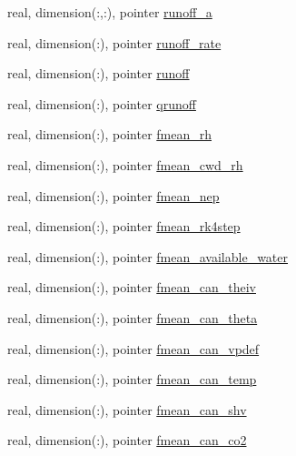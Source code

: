 \begin{DoxyCompactItemize}
\item 
real, dimension(\+:,\+:), pointer \hyperlink{structed__state__vars_1_1sitetype_a2b8d17aeef517cb4e97ad81d3e709b47}{runoff\+\_\+a}
\item 
real, dimension(\+:), pointer \hyperlink{structed__state__vars_1_1sitetype_a608500a8f7ada46291e883d8fec60003}{runoff\+\_\+rate}
\item 
real, dimension(\+:), pointer \hyperlink{structed__state__vars_1_1sitetype_a505920799c9fbba2c8da78e190fd85e9}{runoff}
\item 
real, dimension(\+:), pointer \hyperlink{structed__state__vars_1_1sitetype_a60b4460a57db2b2889aad624dee4ed82}{qrunoff}
\item 
real, dimension(\+:), pointer \hyperlink{structed__state__vars_1_1sitetype_a75cb5c6224b027d13217fab3a59af040}{fmean\+\_\+rh}
\item 
real, dimension(\+:), pointer \hyperlink{structed__state__vars_1_1sitetype_a8040b50d206d96420b709be00647d53a}{fmean\+\_\+cwd\+\_\+rh}
\item 
real, dimension(\+:), pointer \hyperlink{structed__state__vars_1_1sitetype_a36e30c5b27a4f20c7f680d07ae29bd3b}{fmean\+\_\+nep}
\item 
real, dimension(\+:), pointer \hyperlink{structed__state__vars_1_1sitetype_a649f403fc7935f4c7c2065cd945fd09b}{fmean\+\_\+rk4step}
\item 
real, dimension(\+:), pointer \hyperlink{structed__state__vars_1_1sitetype_ac773aae7614e55309e651e099ca7fe09}{fmean\+\_\+available\+\_\+water}
\item 
real, dimension(\+:), pointer \hyperlink{structed__state__vars_1_1sitetype_a826f723a1c42502c7fcfe896fb444f0b}{fmean\+\_\+can\+\_\+theiv}
\item 
real, dimension(\+:), pointer \hyperlink{structed__state__vars_1_1sitetype_aed73c3b56446ff3ce57230620744c706}{fmean\+\_\+can\+\_\+theta}
\item 
real, dimension(\+:), pointer \hyperlink{structed__state__vars_1_1sitetype_ab8d7669fb066ac10fd7b5175881e2450}{fmean\+\_\+can\+\_\+vpdef}
\item 
real, dimension(\+:), pointer \hyperlink{structed__state__vars_1_1sitetype_a91f583be3397a998818cd25d1177030b}{fmean\+\_\+can\+\_\+temp}
\item 
real, dimension(\+:), pointer \hyperlink{structed__state__vars_1_1sitetype_a3f54fea0028557ff2c7bcb1ee55f8357}{fmean\+\_\+can\+\_\+shv}
\item 
real, dimension(\+:), pointer \hyperlink{structed__state__vars_1_1sitetype_a8c13296e6f41784fe065c4f6181f4b5d}{fmean\+\_\+can\+\_\+co2}

\end{DoxyCompactItemize}
